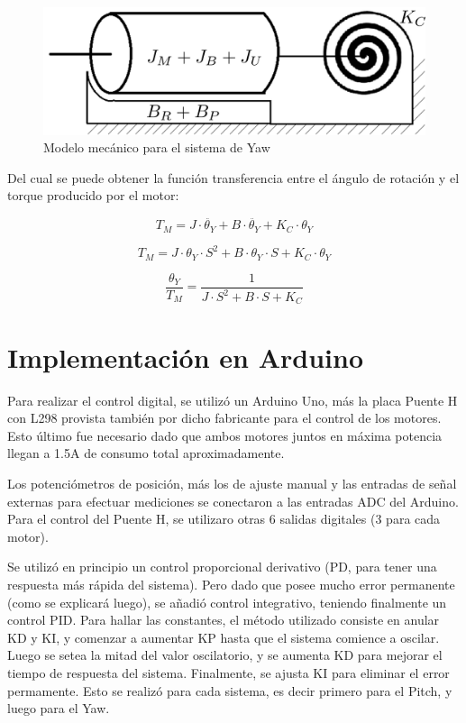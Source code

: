 \documentclass{article}
\begin{document}
\begin{figure}[H]
\centering
\includegraphics[width=0.8\linewidth]{images/modelYaw.png}
\caption{Modelo mecánico para el sistema de Yaw}
\end{figure}

Del cual se puede obtener la función transferencia entre el ángulo de rotación y el torque producido por el motor:

\[
T_M = J \cdot \ddot{\theta_Y} + B \cdot \ddot{\theta_Y} + K_C \cdot \theta_Y
\]

\[
T_M = J \cdot \theta_Y \cdot S^2 + B \cdot \theta_Y \cdot S + K_C \cdot \theta_Y
\]

\[
\frac{\theta_Y}{T_M} = \frac{1}{J \cdot S^2 + B \cdot S + K_C}
\]

\newpage

\section{Implementación en Arduino}

Para realizar el control digital, se utilizó un Arduino Uno, más la placa Puente H con L298 provista también por dicho fabricante para el control de los motores. Esto último fue necesario dado que ambos motores juntos en máxima potencia llegan a 1.5A de consumo total aproximadamente.\par
Los potenciómetros de posición, más los de ajuste manual y las entradas de señal externas para efectuar mediciones se conectaron a las entradas ADC del Arduino. Para el control del Puente H, se utilizaro otras 6 salidas digitales (3 para cada motor).\par
Se utilizó en principio un control proporcional derivativo (PD, para tener una respuesta más rápida del sistema). Pero dado que posee mucho error permanente (como se explicará luego), se añadió control integrativo, teniendo finalmente un control PID. Para hallar las constantes, el método utilizado consiste en anular KD y KI, y comenzar a aumentar KP hasta que el sistema comience a oscilar. Luego se setea la mitad del valor oscilatorio, y se aumenta KD para mejorar el tiempo de respuesta del sistema. Finalmente, se ajusta KI para eliminar el error permamente. Esto se realizó para cada sistema, es decir primero para el Pitch, y luego para el Yaw.\par 
\end{document}

